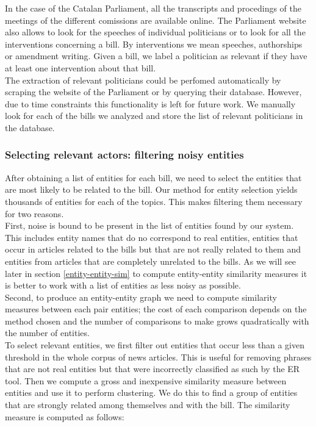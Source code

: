 In the case of the Catalan Parliament, all the transcripts and procedings of the meetings of the different comissions are available online. The Parliament website also allows to look for the speeches of individual politicians or to look for all the interventions concerning a bill. By interventions we mean speeches, authorships or amendment writing. Given a bill, we label a politician as relevant if they have at least one intervention about that bill. \\

The extraction of relevant politicians could be perfomed automatically by scraping the website of the Parliament or by querying their database. However, due to time constraints this functionality is left for future work. We manually look for each of the bills we analyzed and store the list of relevant politicians in the database. \\

\subsubsection{Selecting relevant actors: filtering noisy entities}

After obtaining a list of entities for each bill, we need to select the entities that are most likely to be related to the bill. Our method for entity selection yields thousands of entities for each of the topics. This makes filtering them necessary for two reasons. \\

First, noise is bound to be present in the list of entities found by our system. This includes entity names that do no correspond to real entities, entities that occur in articles related to the bills but that are not really related to them and entities from articles that are completely unrelated to the bills. As we will see later in section \ref{entity-entity-sim} to compute entity-entity similarity measures it is better to work with a list of entities as less noisy as possible. \\

Second, to produce an entity-entity graph we need to compute similarity measures between each pair entities; the cost of each comparison depends on the method chosen and the number of comparisons to make grows quadratically with the number of entities. \\

To select relevant entities, we first filter out entities that occur less than a given threshold in the whole corpus of news articles. This is useful for removing phrases that are not real entities but that were incorrectly classified as such by the ER tool. Then we compute a gross and inexpensive similarity measure between entities and use it to perform clustering. We do this to find a group of entities that are strongly related among themselves and with the bill. The similarity measure is computed as follows:

